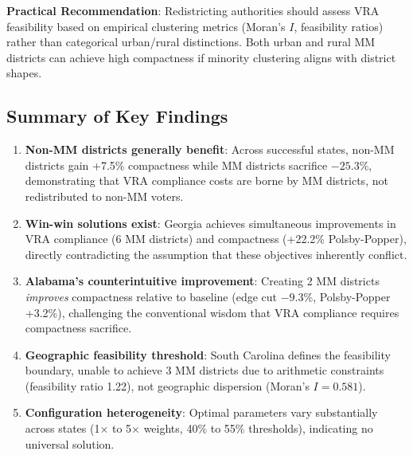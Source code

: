 \textbf{Practical Recommendation}: Redistricting authorities should assess VRA feasibility based on empirical clustering metrics (Moran's $I$, feasibility ratios) rather than categorical urban/rural distinctions. Both urban and rural MM districts can achieve high compactness if minority clustering aligns with district shapes.

\subsection{Summary of Key Findings}

\begin{enumerate}
    \item \textbf{Non-MM districts generally benefit}: Across successful states, non-MM districts gain +7.5\% compactness while MM districts sacrifice $-25.3$\%, demonstrating that VRA compliance costs are borne by MM districts, not redistributed to non-MM voters.

    \item \textbf{Win-win solutions exist}: Georgia achieves simultaneous improvements in VRA compliance (6 MM districts) and compactness (+22.2\% Polsby-Popper), directly contradicting the assumption that these objectives inherently conflict.

    \item \textbf{Alabama's counterintuitive improvement}: Creating 2 MM districts \emph{improves} compactness relative to baseline (edge cut $-9.3$\%, Polsby-Popper +3.2\%), challenging the conventional wisdom that VRA compliance requires compactness sacrifice.

    \item \textbf{Geographic feasibility threshold}: South Carolina defines the feasibility boundary, unable to achieve 3 MM districts due to arithmetic constraints (feasibility ratio 1.22), not geographic dispersion (Moran's $I = 0.581$).

    \item \textbf{Configuration heterogeneity}: Optimal parameters vary substantially across states (1× to 5× weights, 40\% to 55\% thresholds), indicating no universal solution.
\end{enumerate}

